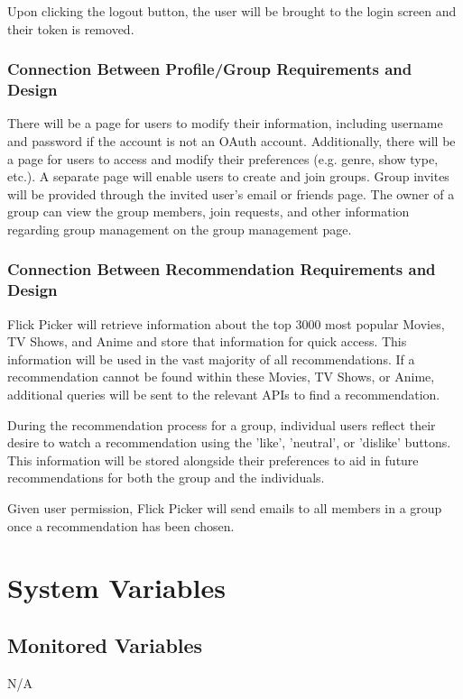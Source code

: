 \documentclass[12pt, titlepage]{article}
\begin{document}
Upon clicking the logout button, the user will be brought to the login screen and their token is removed.

\subsubsection{Connection Between Profile/Group Requirements and Design}
\hspace*{14pt} There will be a page for users to modify their information, including username and password if the account is not an OAuth account. Additionally, there will be a page for users to access and modify their preferences (e.g. genre, show type, etc.). A separate page will enable users to create and join groups. Group invites will be provided through the invited user's email or friends page. The owner of a group can view the group members, join requests, and other information regarding group management on the group management page. 

\subsubsection{Connection Between Recommendation Requirements and Design}
\hspace*{14pt} Flick Picker will retrieve information about the top 3000 most popular Movies, TV Shows, and Anime and store that information for quick access. This information will be used in the vast majority of all recommendations. If a recommendation cannot be found within these Movies, TV Shows, or Anime, additional queries will be sent to the relevant APIs to find a recommendation.

During the recommendation process for a group, individual users reflect their desire to watch a recommendation using the 'like', 'neutral', or 'dislike' buttons. This information will be stored alongside their preferences to aid in future recommendations for both the group and the individuals. 

Given user permission, Flick Picker will send emails to all members in a group once a recommendation has been chosen. 

\section{System Variables}

\subsection{Monitored Variables}
N/A
\end{document}
